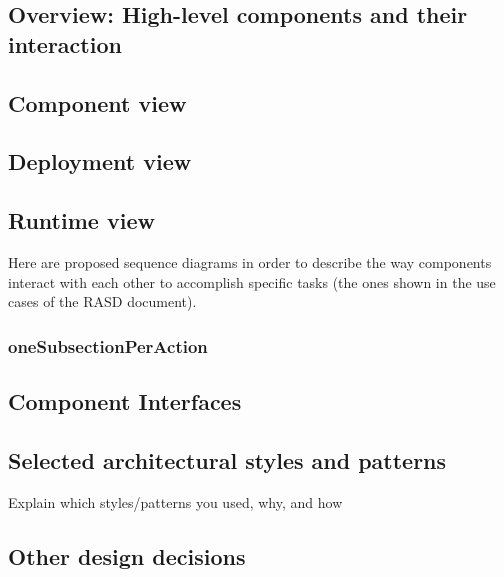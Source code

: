 \subsection{Overview: High-level components and their interaction}

\subsection{Component view}

\subsection{Deployment view}

\subsection{Runtime view}
Here are proposed sequence diagrams in order to describe the way components interact with each other to accomplish specific tasks (the ones shown in the use cases of the RASD document).
\subsubsection{oneSubsectionPerAction}

\subsection{Component Interfaces}

\subsection{Selected architectural styles and patterns}
Explain which styles/patterns you used, why, and how
\subsection {Other design decisions}
